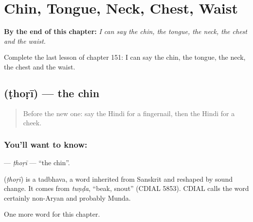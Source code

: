 
\chapter{Chin, Tongue, Neck, Chest, Waist}
\label{ch:hi-chin-tongue-neck-chest-waist}

\begin{chapteropening}
\textbf{By the end of this chapter:} \emph{I can say the chin, the tongue, the neck, the chest and the waist.}

Complete the last lesson of chapter 151: I can say the chin, the tongue, the neck, the chest and the waist.
\end{chapteropening}

\section[\texorpdfstring{\hi{ठोड़ी} (ṭhoṛī)}{ठोड़ी (ṭhoṛī)}]{ (ṭhoṛī) — the chin}

\label{lesson:HI-C151-thori}



\begin{quote}
Before the new one: say the Hindi for a fingernail, then the Hindi for a cheek.
\end{quote}

\subsection*{You'll want to know: }
\textbf{} — \emph{ṭhoṛī} — \textquotedblleft{}the chin\textquotedblright{}.

\begin{cousinweb}
\textbf{} (\emph{ṭhoṛī}) is a tadbhava, a word inherited from Sanskrit and reshaped by sound change. It comes from \emph{tuṇḍa}, \textquotedblleft{}beak, snout\textquotedblright{} (CDIAL 5853). CDIAL calls the word certainly non-Aryan and probably Munda.
\end{cousinweb}

\begin{grammarlens}[title={What you've built}]
One more word for this chapter.
\end{grammarlens}

